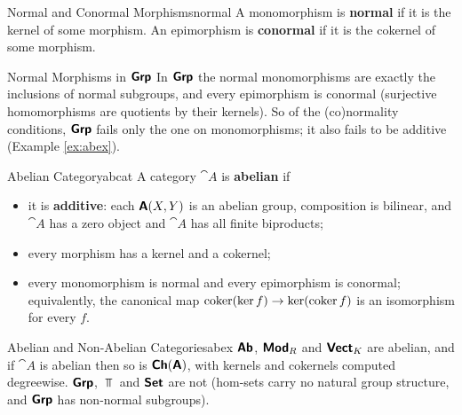 \begin{definition}{Normal and Conormal Morphisms}{normal}
    A monomorphism is \textbf{normal} if it is the kernel of some morphism. An epimorphism is \textbf{conormal} if it is the cokernel of some morphism.
\end{definition}

\begin{remark}{Normal Morphisms in $\bm{\mathsf{Grp}}$}{}
    In $\bm{\mathsf{Grp}}$ the normal monomorphisms are exactly the inclusions of normal subgroups, and every epimorphism is conormal (surjective homomorphisms are quotients by their kernels). So of the (co)normality conditions, $\bm{\mathsf{Grp}}$ fails only the one on monomorphisms; it also fails to be additive (Example \ref{ex:abex}).
\end{remark}

\begin{definition}{Abelian Category}{abcat}
    A category $\cat{A}$ is \textbf{abelian} if
    \begin{itemize}
        \item it is \textbf{additive}: each $\bm{\mathsf{A}}(X,Y)$ is an abelian group, composition is bilinear, and $\cat{A}$ has a zero object and $\cat{A}$ has all finite biproducts;
        \item every morphism has a kernel and a cokernel;
        \item every monomorphism is normal and every epimorphism is conormal; equivalently, the canonical map $\operatorname{coker}(\ker f)\to\ker(\operatorname{coker} f)$ is an isomorphism for every $f$.
    \end{itemize}
\end{definition}

\begin{example}{Abelian and Non-Abelian Categories}{abex}
    $\bm{\mathsf{Ab}}$, $\bm{\mathsf{Mod}}_R$ and $\bm{\mathsf{Vect}}_K$ are abelian, and if $\cat{A}$ is abelian then so is $\bm{\mathsf{Ch}}(\bm{\mathsf{A}})$, with kernels and cokernels computed degreewise. $\bm{\mathsf{Grp}}$, $\Top$ and $\bm{\mathsf{Set}}$ are not (hom-sets carry no natural group structure, and $\bm{\mathsf{Grp}}$ has non-normal subgroups).
\end{example}
